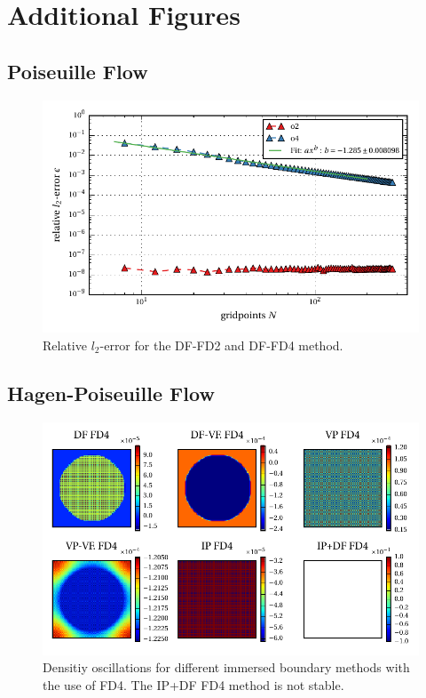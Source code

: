 \chapter{Additional Figures}

\section{Poiseuille Flow}
\begin{figure}[!h]
    \centering
    \includegraphics{gfx/immersed_boundary/poiseuille_flow/3_df/relative_l2error.pdf}
    \caption{Relative $l_2$-error for the DF-FD2 and DF-FD4 method.}
    \label{fig:vali_pflow_3gc}
\end{figure}

\clearpage

\section{Hagen-Poiseuille Flow}

\begin{figure}[!h]
  \centering
  \includegraphics{gfx/immersed_boundary/hpflow/long/rho.pdf}
  \caption{Densitiy oscillations for different immersed boundary methods with the use of FD4. The IP+DF FD4 method is not stable.}
    \label{fig:hpflow_allgc_theo}
\end{figure}
\clearpage

